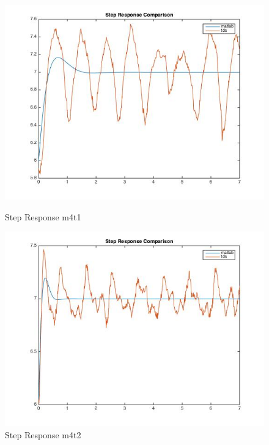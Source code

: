 \documentclass[11pt,titlepage]{article}
\begin{document}
    \begin{figure}[H]
        \centering
        \begin{minipage}{.5\textwidth}
            \centering
            \includegraphics[scale=.3]{stepM4_T1}
            \caption{Step Response m4t1}
            \label{fig:stepM4_T1}
        \end{minipage}%
        \begin{minipage}{.5\textwidth}
            \centering
            \includegraphics[scale=.3]{stepM4_T2}
            \caption{Step Response m4t2}
            \label{fig:stepM4_T2}
        \end{minipage}%
    \end{figure}
\end{document}
